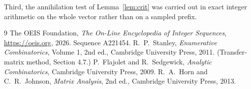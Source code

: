 \documentclass[11pt,a4paper]{article}
\theoremstyle{plain}
\theoremstyle{definition}
\begin{document}
Third, the annihilation test of Lemma~\ref{lem:crit} was carried out in exact integer
arithmetic on the whole vector rather than on a sampled prefix.

\begin{thebibliography}{9}
 The OEIS Foundation, \emph{The On-Line Encyclopedia of Integer
Sequences}, \url{https://oeis.org}, 2026. Sequence A221454.
 R.~P.~Stanley, \emph{Enumerative Combinatorics}, Volume 1, 2nd ed.,
Cambridge University Press, 2011. (Transfer-matrix method, Section 4.7.)
 P.~Flajolet and R.~Sedgewick, \emph{Analytic Combinatorics}, Cambridge
University Press, 2009.
 R.~A.~Horn and C.~R.~Johnson, \emph{Matrix Analysis}, 2nd ed., Cambridge
University Press, 2013.
\end{thebibliography}
\end{document}

